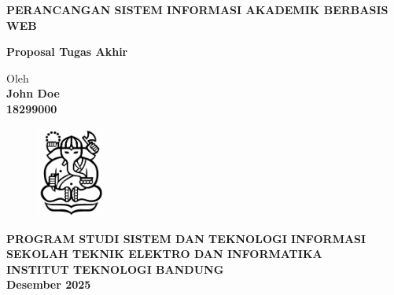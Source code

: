 \documentclass[12pt,a4paper,oneside]{book}
\begin{document}
\begin{titlepage}
\begin{center}

    
    \vspace*{3cm}
    
    {\Large\bfseries PERANCANGAN SISTEM INFORMASI AKADEMIK BERBASIS WEB}\\
     \vspace{4cm}

    {\Large \textbf{Proposal Tugas Akhir}}\\


    \vspace{2cm}
    
    
    {\large Oleh}\\[0.3cm]
    \textbf{
    {\large John Doe}\\
    {\large 18299000}
    }\\

    \vspace{2cm}
    
    \begin{figure}[h]
    \centering
    \includegraphics[width=0.2\textwidth]{ganesha.jpg}
    \end{figure}
    
    
     \vspace{1cm}

    \textbf{
    {\large PROGRAM STUDI SISTEM DAN TEKNOLOGI INFORMASI}\\
    {\large SEKOLAH TEKNIK ELEKTRO DAN INFORMATIKA}\\
    {\large INSTITUT TEKNOLOGI BANDUNG}\\
    {\large Desember 2025}
    }
\end{center}
\end{titlepage}
\end{document}
